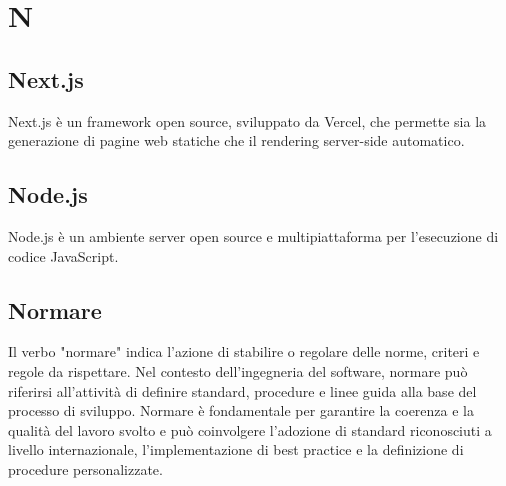 \section{N}

\vspace{2em}
\subsection*{Next.js}
\par Next.js è un framework open source, sviluppato da Vercel, che permette sia la generazione di pagine web statiche che il rendering server-side automatico.

\vspace{2em}
\subsection*{Node.js}
\par Node.js è un ambiente server open source e multipiattaforma per l'esecuzione di codice JavaScript.

\vspace{2em}
\subsection*{Normare}
\par Il verbo "normare" indica l'azione di stabilire o regolare delle norme, criteri e regole da rispettare. Nel contesto dell'ingegneria del software, normare può riferirsi all'attività di definire standard, procedure e linee guida alla base del processo di sviluppo. Normare è fondamentale per garantire la coerenza e la qualità del lavoro svolto e può coinvolgere l'adozione di standard riconosciuti a livello internazionale, l'implementazione di best practice e la definizione di procedure personalizzate.
